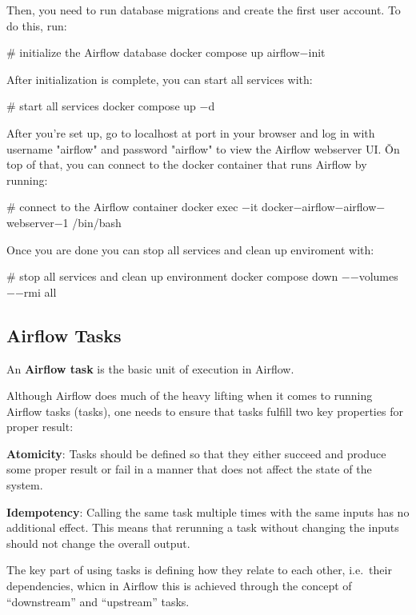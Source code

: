 Then, you need to run database migrations and create the first user account. To do this, run:
\begin{bash}
# initialize the Airflow database
docker compose up airflow$-$init
\end{bash}

After initialization is complete, you can start all services with:
\begin{bash}
# start all services
docker compose up $-$d
\end{bash}

After you're set up, go to localhost at port  in your browser and log in with username "airflow" and password
"airflow" to view the Airflow webserver UI\@. \v

On top of that, you can connect to the docker container that runs Airflow by running:
\begin{bash}
# connect to the Airflow container
docker exec $-$it docker$-$airflow$-$airflow$-$webserver$-$1 /bin/bash
\end{bash}

Once you are done you can stop all services and clean up enviroment with:
\begin{bash}
# stop all services and clean up environment
docker compose down $-$$-$volumes $-$$-$rmi all
\end{bash}

\subsection{Airflow Tasks}

An \textbf{Airflow task} is the basic unit of execution in Airflow.
\ed

Although Airflow does much of the heavy lifting when it comes to running Airflow tasks (tasks), one needs to ensure
that tasks fulfill two key properties for proper result:
\bit
\item \textbf{Atomicity}: Tasks should be defined so that they either succeed and produce some proper result or fail in
a manner that does not affect the state of the system.
\item \textbf{Idempotency}: Calling the same task multiple times with the same inputs has no additional effect. This
means that rerunning a task without changing the inputs should not change the overall output.
\eit

The key part of using tasks is defining how they relate to each other, i.e.\ their dependencies, whicn in Airflow this
is achieved through the concept of ``downstream'' and ``upstream'' tasks.

